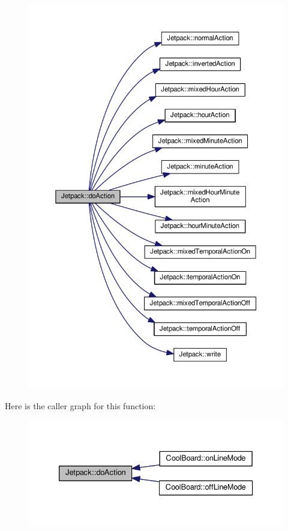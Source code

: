 \begin{figure}[H]
\begin{center}
\leavevmode
\includegraphics[width=350pt]{df/d1d/class_jetpack_a9e703197093094b963f9ad57817495b8_cgraph}
\end{center}
\end{figure}
Here is the caller graph for this function\+:
\nopagebreak
\begin{figure}[H]
\begin{center}
\leavevmode
\includegraphics[width=333pt]{df/d1d/class_jetpack_a9e703197093094b963f9ad57817495b8_icgraph}
\end{center}
\end{figure}
\mbox{\label{class_jetpack_acd6889af2fe5b057c6bd51b6dac827ef}} 
